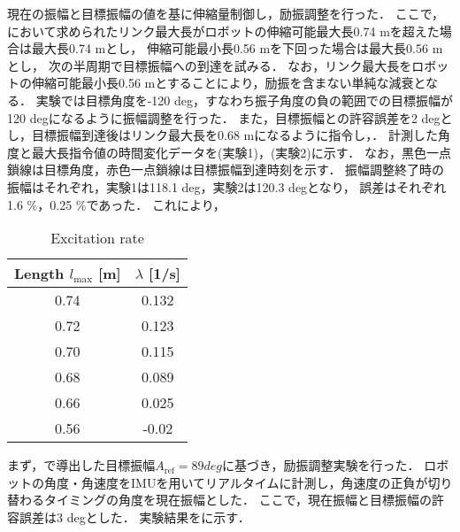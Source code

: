         現在の振幅と目標振幅の値を基に伸縮量制御し，励振調整を行った．
        ここで，において求められたリンク最大長がロボットの伸縮可能最大長0.74 mを超えた場合は最大長0.74 mとし，
        伸縮可能最小長0.56 mを下回った場合は最大長0.56 mとし，
        次の半周期で目標振幅への到達を試みる．
        なお，リンク最大長をロボットの伸縮可能最小長0.56 mとすることにより，励振を含まない単純な減衰となる．
        実験では目標角度を-120 deg，すなわち振子角度の負の範囲での目標振幅が120 degになるように振幅調整を行った．
        また，目標振幅との許容誤差を2 degとし，目標振幅到達後はリンク最大長を0.68 mになるように指令し，．
        計測した角度と最大長指令値の時間変化データを(実験1)，(実験2)に示す．
        なお，黒色一点鎖線は目標角度，赤色一点鎖線は目標振幅到達時刻を示す．
        振幅調整終了時の振幅はそれぞれ，実験1は118.1 deg，実験2は120.3 degとなり，
        誤差はそれぞれ1.6 $\%$，0.25 $\%$であった．
        これにより，
        \begin{table}[tb]
          \begin{center}
            \caption{Excitation rate}
            \tablabel{}
            \vspace{2mm}
            \begin{tabular}{c|c}
              \hline
              Length $l_{\mathrm{max}}$ [m] & $\lambda$ [1/s] \\
              \hline
              0.74 &  0.132\\
              0.72 &  0.123\\
              0.70 &  0.115\\
              0.68 &  0.089\\
              0.66 &  0.025\\
              0.56 &  -0.02\\                       
              \hline
            \end{tabular}
          \end{center}
        \end{table}
        まず，で導出した目標振幅$A_{\mathrm{ref}}=89 deg$に基づき，励振調整実験を行った．
        ロボットの角度・角速度をIMUを用いてリアルタイムに計測し，角速度の正負が切り替わるタイミングの角度を現在振幅とした．
        ここで，現在振幅と目標振幅の許容誤差は3 degとした．
        実験結果を\figref{}に示す．


